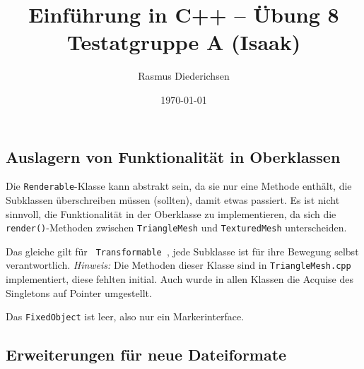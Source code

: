 \documentclass{article}
\title{Einführung in C++ -- Übung 8 \\ Testatgruppe A (Isaak)}
\author{Rasmus Diederichsen}
\date{\today}
\begin{document}
   \maketitle

   \setcounter{section}{8}

   \subsection{Auslagern von Funktionalität in Oberklassen}
   
   Die \texttt{Renderable}-Klasse kann abstrakt sein, da sie nur eine Methode
   enthält, die Subklassen überschreiben müssen (sollten), damit etwas passiert.
   Es ist nicht sinnvoll, die Funktionalität in der Oberklasse zu
   implementieren, da sich die \texttt{render()}-Methoden zwischen
   \texttt{TriangleMesh} und \texttt{TexturedMesh} unterscheiden.

   

   Das gleiche gilt für \texttt{ Transformable }, jede Subklasse ist für ihre
   Bewegung selbst verantwortlich. 
   \emph{Hinweis:} Die Methoden dieser Klasse sind in
   \texttt{TriangleMesh.cpp} implementiert, diese fehlten initial. Auch wurde in
   allen Klassen die Acquise des Singletons auf Pointer umgestellt.

   

   Das \texttt{FixedObject} ist leer, also nur ein Markerinterface.

   

   \subsection{Erweiterungen für neue Dateiformate}
   
   
   
   
   
   
   
\end{document}
